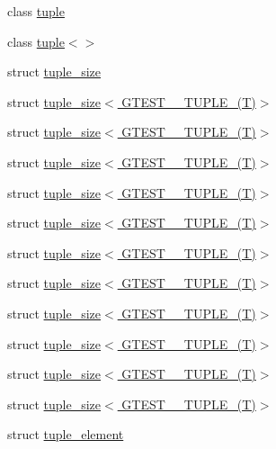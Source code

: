 \begin{DoxyCompactItemize}
\item 
class \hyperlink{classstd_1_1tr1_1_1tuple}{tuple}
\item 
class \hyperlink{classstd_1_1tr1_1_1tuple_3_4}{tuple$<$$>$}
\item 
struct \hyperlink{structstd_1_1tr1_1_1tuple__size}{tuple\-\_\-size}
\item 
struct \hyperlink{structstd_1_1tr1_1_1tuple__size_3_01GTEST__0__TUPLE___07T_08_4}{tuple\-\_\-size$<$ G\-T\-E\-S\-T\-\_\-\_\-\-T\-U\-P\-L\-E\-\_\-(\-T)$>$}
\item 
struct \hyperlink{structstd_1_1tr1_1_1tuple__size_3_01GTEST__1__TUPLE___07T_08_4}{tuple\-\_\-size$<$ G\-T\-E\-S\-T\-\_\-\_\-\-T\-U\-P\-L\-E\-\_\-(\-T)$>$}
\item 
struct \hyperlink{structstd_1_1tr1_1_1tuple__size_3_01GTEST__2__TUPLE___07T_08_4}{tuple\-\_\-size$<$ G\-T\-E\-S\-T\-\_\-\_\-\-T\-U\-P\-L\-E\-\_\-(\-T)$>$}
\item 
struct \hyperlink{structstd_1_1tr1_1_1tuple__size_3_01GTEST__3__TUPLE___07T_08_4}{tuple\-\_\-size$<$ G\-T\-E\-S\-T\-\_\-\_\-\-T\-U\-P\-L\-E\-\_\-(\-T)$>$}
\item 
struct \hyperlink{structstd_1_1tr1_1_1tuple__size_3_01GTEST__4__TUPLE___07T_08_4}{tuple\-\_\-size$<$ G\-T\-E\-S\-T\-\_\-\_\-\-T\-U\-P\-L\-E\-\_\-(\-T)$>$}
\item 
struct \hyperlink{structstd_1_1tr1_1_1tuple__size_3_01GTEST__5__TUPLE___07T_08_4}{tuple\-\_\-size$<$ G\-T\-E\-S\-T\-\_\-\_\-\-T\-U\-P\-L\-E\-\_\-(\-T)$>$}
\item 
struct \hyperlink{structstd_1_1tr1_1_1tuple__size_3_01GTEST__6__TUPLE___07T_08_4}{tuple\-\_\-size$<$ G\-T\-E\-S\-T\-\_\-\_\-\-T\-U\-P\-L\-E\-\_\-(\-T)$>$}
\item 
struct \hyperlink{structstd_1_1tr1_1_1tuple__size_3_01GTEST__7__TUPLE___07T_08_4}{tuple\-\_\-size$<$ G\-T\-E\-S\-T\-\_\-\_\-\-T\-U\-P\-L\-E\-\_\-(\-T)$>$}
\item 
struct \hyperlink{structstd_1_1tr1_1_1tuple__size_3_01GTEST__8__TUPLE___07T_08_4}{tuple\-\_\-size$<$ G\-T\-E\-S\-T\-\_\-\_\-\-T\-U\-P\-L\-E\-\_\-(\-T)$>$}
\item 
struct \hyperlink{structstd_1_1tr1_1_1tuple__size_3_01GTEST__9__TUPLE___07T_08_4}{tuple\-\_\-size$<$ G\-T\-E\-S\-T\-\_\-\_\-\-T\-U\-P\-L\-E\-\_\-(\-T)$>$}
\item 
struct \hyperlink{structstd_1_1tr1_1_1tuple__size_3_01GTEST__10__TUPLE___07T_08_4}{tuple\-\_\-size$<$ G\-T\-E\-S\-T\-\_\-\_\-\-T\-U\-P\-L\-E\-\_\-(\-T)$>$}
\item 
struct \hyperlink{structstd_1_1tr1_1_1tuple__element}{tuple\-\_\-element}
\end{DoxyCompactItemize}
